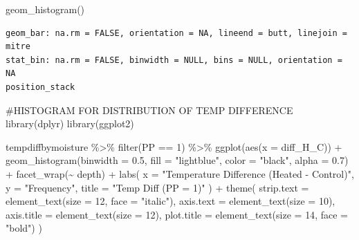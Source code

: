 \documentclass[
  letterpaper,
  DIV=11,
  numbers=noendperiod]{scrartcl}
\newenvironment{Shaded}{\begin{snugshade}}{\end{snugshade}}
\newcommand{\AttributeTok}[1]{\textcolor[rgb]{0.40,0.45,0.13}{#1}}
\newcommand{\CommentTok}[1]{\textcolor[rgb]{0.37,0.37,0.37}{#1}}
\newcommand{\DecValTok}[1]{\textcolor[rgb]{0.68,0.00,0.00}{#1}}
\newcommand{\FloatTok}[1]{\textcolor[rgb]{0.68,0.00,0.00}{#1}}
\newcommand{\FunctionTok}[1]{\textcolor[rgb]{0.28,0.35,0.67}{#1}}
\newcommand{\NormalTok}[1]{\textcolor[rgb]{0.00,0.23,0.31}{#1}}
\newcommand{\SpecialCharTok}[1]{\textcolor[rgb]{0.37,0.37,0.37}{#1}}
\newcommand{\StringTok}[1]{\textcolor[rgb]{0.13,0.47,0.30}{#1}}
\begin{document}
\begin{Shaded}
\begin{Highlighting}[]
  \FunctionTok{geom\_histogram}\NormalTok{()}
\end{Highlighting}
\end{Shaded}

\begin{verbatim}
geom_bar: na.rm = FALSE, orientation = NA, lineend = butt, linejoin = mitre
stat_bin: na.rm = FALSE, binwidth = NULL, bins = NULL, orientation = NA
position_stack 
\end{verbatim}

\begin{Shaded}
\begin{Highlighting}[]
\CommentTok{\#HISTOGRAM FOR DISTRIBUTION OF TEMP DIFFERENCE}
\FunctionTok{library}\NormalTok{(dplyr)}
\FunctionTok{library}\NormalTok{(ggplot2)}

\NormalTok{tempdiffbymoisture }\SpecialCharTok{\%\textgreater{}\%}
  \FunctionTok{filter}\NormalTok{(PP }\SpecialCharTok{==} \DecValTok{1}\NormalTok{) }\SpecialCharTok{\%\textgreater{}\%}
  \FunctionTok{ggplot}\NormalTok{(}\FunctionTok{aes}\NormalTok{(}\AttributeTok{x =}\NormalTok{ diff\_H\_C)) }\SpecialCharTok{+}
  \FunctionTok{geom\_histogram}\NormalTok{(}\AttributeTok{binwidth =} \FloatTok{0.5}\NormalTok{, }\AttributeTok{fill =} \StringTok{"lightblue"}\NormalTok{, }\AttributeTok{color =} \StringTok{"black"}\NormalTok{, }\AttributeTok{alpha =} \FloatTok{0.7}\NormalTok{) }\SpecialCharTok{+}
  \FunctionTok{facet\_wrap}\NormalTok{(}\SpecialCharTok{\textasciitilde{}}\NormalTok{ depth) }\SpecialCharTok{+}
  \FunctionTok{labs}\NormalTok{(}
    \AttributeTok{x =} \StringTok{"Temperature Difference (Heated {-} Control)"}\NormalTok{,}
    \AttributeTok{y =} \StringTok{"Frequency"}\NormalTok{,}
    \AttributeTok{title =} \StringTok{"Temp Diff (PP = 1)"}
\NormalTok{  ) }\SpecialCharTok{+}
  \FunctionTok{theme}\NormalTok{(}
    \AttributeTok{strip.text =} \FunctionTok{element\_text}\NormalTok{(}\AttributeTok{size =} \DecValTok{12}\NormalTok{, }\AttributeTok{face =} \StringTok{"italic"}\NormalTok{),}
    \AttributeTok{axis.text =} \FunctionTok{element\_text}\NormalTok{(}\AttributeTok{size =} \DecValTok{10}\NormalTok{),}
    \AttributeTok{axis.title =} \FunctionTok{element\_text}\NormalTok{(}\AttributeTok{size =} \DecValTok{12}\NormalTok{),}
    \AttributeTok{plot.title =} \FunctionTok{element\_text}\NormalTok{(}\AttributeTok{size =} \DecValTok{14}\NormalTok{, }\AttributeTok{face =} \StringTok{"bold"}\NormalTok{)}
\NormalTok{  )}
\end{Highlighting}
\end{Shaded}
\end{document}
